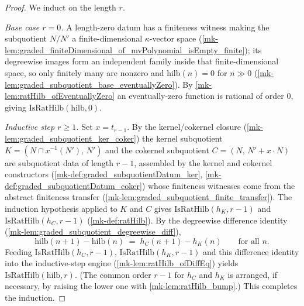 \begin{proof}
  \leanok
    We induct on the length \(r\).

  \emph{Base case \(r = 0\).} A length-zero datum has a finiteness witness making the
  subquotient \(N/N'\) a finite-dimensional \(\kappa\)-vector space
  (\ref{mk-lem:graded_finiteDimensional_of_mvPolynomial_isEmpty_finite}); its degreewise
  images form an independent family inside that finite-dimensional space, so only
  finitely many are nonzero and \(\mathrm{hilb}(n) = 0\) for \(n \gg 0\)
  (\ref{mk-lem:graded_subquotient_base_eventuallyZero}). By
  \ref{mk-lem:ratHilb_ofEventuallyZero} an eventually-zero function is rational of order
  \(0\), giving \(\mathrm{IsRatHilb}(\mathrm{hilb}, 0)\).

  \emph{Inductive step \(r \ge 1\).} Set \(x = t_{r-1}\). By the kernel/cokernel
  closure (\ref{mk-lem:graded_subquotient_ker_coker}) the kernel subquotient
  \(K = (N \cap x^{-1}(N'),\, N')\) and the cokernel subquotient
  \(C = (N,\, N' + x \cdot N)\) are subquotient data of length \(r-1\), assembled by
  the kernel and cokernel constructors (\ref{mk-def:graded_subquotientDatum_ker},
  \ref{mk-def:graded_subquotientDatum_coker}) whose finiteness witnesses come from the
  abstract finiteness transfer (\ref{mk-lem:graded_subquotient_finite_transfer}). The
  induction hypothesis applied
  to \(K\) and \(C\) gives \(\mathrm{IsRatHilb}(h_K, r-1)\) and
  \(\mathrm{IsRatHilb}(h_C, r-1)\) (\ref{mk-def:ratHilb}). By the degreewise
  difference identity (\ref{mk-lem:graded_subquotient_degreewise_diff}),
  \[
    \mathrm{hilb}(n+1) - \mathrm{hilb}(n) \;=\; h_C(n+1) - h_K(n)
    \qquad \text{for all } n .
  \]
  Feeding \(\mathrm{IsRatHilb}(h_C, r-1)\), \(\mathrm{IsRatHilb}(h_K, r-1)\) and this
  difference identity into the inductive-step engine
  (\ref{mk-lem:ratHilb_ofDiffEq}) yields \(\mathrm{IsRatHilb}(\mathrm{hilb}, r)\). (The
  common order \(r-1\) for \(h_C\) and \(h_K\) is arranged, if necessary, by raising
  the lower one with \ref{mk-lem:ratHilb_bump}.) This completes the induction.
\end{proof}

